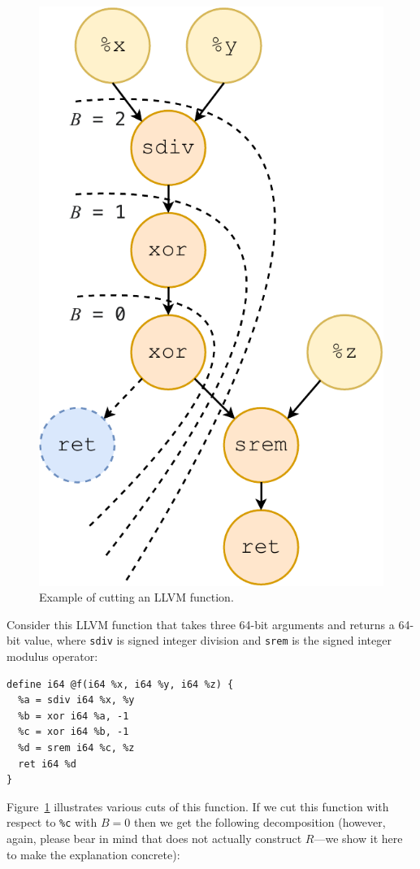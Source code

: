 \begin{figure}[tbp]
  \centering
  \includegraphics[width=0.6\linewidth]{figures/cut-depth.pdf}
  \caption{Example of cutting an LLVM function.}
  \label{fig:cut-depth}
\end{figure}

Consider this LLVM function that takes three 64-bit arguments and
returns a 64-bit value, where \texttt{sdiv} is signed integer division
and \texttt{srem} is the signed integer modulus operator:


{\begin{quoting}
\begin{Verbatim}
define i64 @f(i64 %x, i64 %y, i64 %z) {
  %a = sdiv i64 %x, %y
  %b = xor i64 %a, -1
  %c = xor i64 %b, -1
  %d = srem i64 %c, %z
  ret i64 %d
}
\end{Verbatim}
\end{quoting}}

Figure~\ref{fig:cut-depth} illustrates various cuts of this function.
%
If we cut this function with respect to \texttt{\%c} with $B = 0$ then
we get the following decomposition (however, again, please bear in
mind that \minotaur{} does not actually construct $R$---we show it here to
make the explanation concrete):

